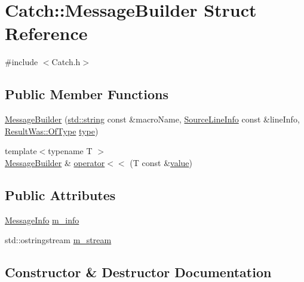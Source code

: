\hypertarget{struct_catch_1_1_message_builder}{}\section{Catch\+:\+:Message\+Builder Struct Reference}
\label{struct_catch_1_1_message_builder}


{\ttfamily \#include $<$Catch.\+h$>$}

\subsection*{Public Member Functions}
\begin{DoxyCompactItemize}
\item 
\hyperlink{struct_catch_1_1_message_builder_ab0c6378e722680bf58852c6ee2b6e724}{Message\+Builder} (\hyperlink{_s_d_l__opengl__glext_8h_ae84541b4f3d8e1ea24ec0f466a8c568b}{std\+::string} const \&macro\+Name, \hyperlink{struct_catch_1_1_source_line_info}{Source\+Line\+Info} const \&line\+Info, \hyperlink{struct_catch_1_1_result_was_a624e1ee3661fcf6094ceef1f654601ef}{Result\+Was\+::\+Of\+Type} \hyperlink{_s_d_l__opengl_8h_ad5ddf6fca7b585646515660e810e0188}{type})
\item 
{\footnotesize template$<$typename T $>$ }\\\hyperlink{struct_catch_1_1_message_builder}{Message\+Builder} \& \hyperlink{struct_catch_1_1_message_builder_a20fa48d069b20dddcc2d3df8abb123c1}{operator$<$$<$} (T const \&\hyperlink{_s_d_l__opengl__glext_8h_a8ad81492d410ff2ac11f754f4042150f}{value})
\end{DoxyCompactItemize}
\subsection*{Public Attributes}
\begin{DoxyCompactItemize}
\item 
\hyperlink{struct_catch_1_1_message_info}{Message\+Info} \hyperlink{struct_catch_1_1_message_builder_a979f1c2b36d78f80ee275bfa5ba0209f}{m\+\_\+info}
\item 
std\+::ostringstream \hyperlink{struct_catch_1_1_message_builder_a6488ab0cc4ea52affc9c0612c7c5df6b}{m\+\_\+stream}
\end{DoxyCompactItemize}


\subsection{Constructor \& Destructor Documentation}
